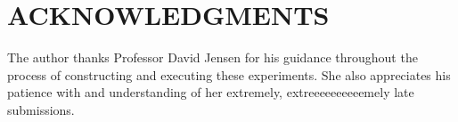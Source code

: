 \documentclass[letterpaper, 10 pt, conference]{ieeeconf}  %
\begin{document}
\section*{ACKNOWLEDGMENTS}

The author thanks Professor David Jensen for his guidance throughout the process of constructing and executing these experiments. She also appreciates his patience with and understanding of her extremely, extreeeeeeeeeemely late submissions.






\end{document}
